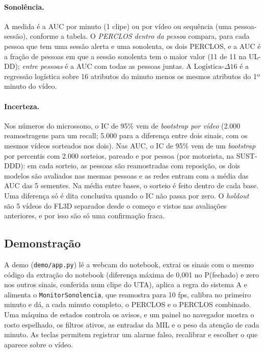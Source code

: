 \documentclass[11pt,a4paper]{article}
\begin{document}
\paragraph{Sonolência.} A medida é a AUC por minuto (1 clipe) ou por vídeo ou sequência (uma pessoa-sessão), conforme a tabela. O \emph{PERCLOS dentro da pessoa} compara, para cada pessoa que tem uma sessão alerta e uma sonolenta, os dois PERCLOS, e a AUC é a fração de pessoas em que a sessão sonolenta tem o maior valor (11 de 11 na UL-DD); \emph{entre pessoas} é a AUC com todas as pessoas juntas. A $\text{Logística-}\Delta16$ é a regressão logística sobre 16 atributos do minuto menos os mesmos atributos do 1º minuto do vídeo.

\paragraph{Incerteza.} Nos números do microssono, o IC de 95\% vem de \emph{bootstrap por vídeo} (2.000 reamostragens para um recall; 5.000 para a diferença entre dois sinais, com os mesmos vídeos sorteados nos dois). Nas AUC, o IC de 95\% vem de um \emph{bootstrap} por percentis com 2.000 sorteios, pareado e por pessoa (por motorista, na SUST-DDD): em cada sorteio, as pessoas são reamostradas com reposição, os dois modelos são avaliados nas mesmas pessoas e as redes entram com a média das AUC das 5 sementes. Na média entre bases, o sorteio é feito dentro de cada base. Uma diferença só é dita conclusiva quando o IC não passa por zero. O \emph{holdout} são 5 vídeos do FL3D separados desde o começo e vistos nas avaliações anteriores, e por isso são só uma confirmação fraca.

\subsection{Demonstração}
\label{sec:demo}

A demo (\texttt{demo/app.py}) lê a webcam do notebook, extrai os sinais com o mesmo código da extração do notebook (diferença máxima de 0,001 no P(fechado) e zero nos outros sinais, conferida num clipe do UTA), aplica a regra do sistema A e alimenta o \texttt{MonitorSonolencia}, que reamostra para 10 fps, calibra no primeiro minuto e dá, a cada minuto completo, o PERCLOS e o PERCLOS combinado. Uma máquina de estados controla os avisos, e um painel no navegador mostra o rosto espelhado, os filtros ativos, as entradas da MIL e o peso da atenção de cada minuto. As teclas permitem registrar um alarme falso, recalibrar e escolher o que aparece sobre o vídeo.
\end{document}
